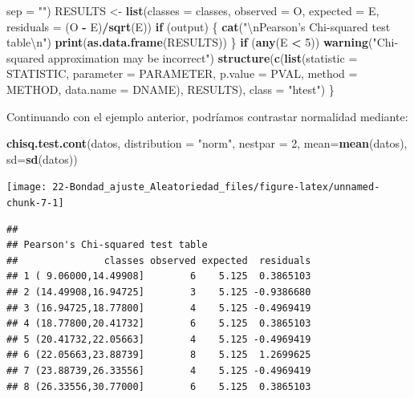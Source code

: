 \documentclass[
]{book}
\newenvironment{Shaded}{\begin{snugshade}}{\end{snugshade}}
\newcommand{\CharTok}[1]{\textcolor[rgb]{0.31,0.60,0.02}{#1}}
\newcommand{\ControlFlowTok}[1]{\textcolor[rgb]{0.13,0.29,0.53}{\textbf{#1}}}
\newcommand{\DataTypeTok}[1]{\textcolor[rgb]{0.13,0.29,0.53}{#1}}
\newcommand{\DecValTok}[1]{\textcolor[rgb]{0.00,0.00,0.81}{#1}}
\newcommand{\KeywordTok}[1]{\textcolor[rgb]{0.13,0.29,0.53}{\textbf{#1}}}
\newcommand{\NormalTok}[1]{#1}
\newcommand{\OperatorTok}[1]{\textcolor[rgb]{0.81,0.36,0.00}{\textbf{#1}}}
\newcommand{\StringTok}[1]{\textcolor[rgb]{0.31,0.60,0.02}{#1}}
\theoremstyle{break}
\theoremstyle{definition}
\theoremstyle{definition}
\theoremstyle{definition}
\theoremstyle{remark}
\begin{document}
\begin{Shaded}
\begin{Highlighting}[]
        \DataTypeTok{sep =} \StringTok{""}\NormalTok{)}
\NormalTok{    RESULTS <-}\StringTok{ }\KeywordTok{list}\NormalTok{(}\DataTypeTok{classes =}\NormalTok{ classes, }\DataTypeTok{observed =}\NormalTok{ O, }\DataTypeTok{expected =}\NormalTok{ E, }\DataTypeTok{residuals =}\NormalTok{ (O }\OperatorTok{-}\StringTok{ }
\StringTok{        }\NormalTok{E)}\OperatorTok{/}\KeywordTok{sqrt}\NormalTok{(E))}
    \ControlFlowTok{if}\NormalTok{ (output) \{}
        \KeywordTok{cat}\NormalTok{(}\StringTok{"}\CharTok{\textbackslash{}n}\StringTok{Pearson's Chi-squared test table}\CharTok{\textbackslash{}n}\StringTok{"}\NormalTok{)}
        \KeywordTok{print}\NormalTok{(}\KeywordTok{as.data.frame}\NormalTok{(RESULTS))}
\NormalTok{    \}}
    \ControlFlowTok{if}\NormalTok{ (}\KeywordTok{any}\NormalTok{(E }\OperatorTok{<}\StringTok{ }\DecValTok{5}\NormalTok{)) }
        \KeywordTok{warning}\NormalTok{(}\StringTok{"Chi-squared approximation may be incorrect"}\NormalTok{)}
    \KeywordTok{structure}\NormalTok{(}\KeywordTok{c}\NormalTok{(}\KeywordTok{list}\NormalTok{(}\DataTypeTok{statistic =}\NormalTok{ STATISTIC, }\DataTypeTok{parameter =}\NormalTok{ PARAMETER, }\DataTypeTok{p.value =}\NormalTok{ PVAL, }
        \DataTypeTok{method =}\NormalTok{ METHOD, }\DataTypeTok{data.name =}\NormalTok{ DNAME), RESULTS), }\DataTypeTok{class =} \StringTok{"htest"}\NormalTok{)}
\NormalTok{\}}
\end{Highlighting}
\end{Shaded}

Continuando con el ejemplo anterior, podríamos contrastar normalidad mediante:

\begin{Shaded}
\begin{Highlighting}[]
\KeywordTok{chisq.test.cont}\NormalTok{(datos, }\DataTypeTok{distribution =} \StringTok{"norm"}\NormalTok{, }\DataTypeTok{nestpar =} \DecValTok{2}\NormalTok{, }\DataTypeTok{mean=}\KeywordTok{mean}\NormalTok{(datos), }\DataTypeTok{sd=}\KeywordTok{sd}\NormalTok{(datos))}
\end{Highlighting}
\end{Shaded}

\begin{center}\texttt{[image: 22-Bondad\_ajuste\_Aleatoriedad\_files/figure-latex/unnamed-chunk-7-1]} \end{center}

\begin{verbatim}
## 
## Pearson's Chi-squared test table
##               classes observed expected  residuals
## 1 ( 9.06000,14.49908]        6    5.125  0.3865103
## 2 (14.49908,16.94725]        3    5.125 -0.9386680
## 3 (16.94725,18.77800]        4    5.125 -0.4969419
## 4 (18.77800,20.41732]        6    5.125  0.3865103
## 5 (20.41732,22.05663]        4    5.125 -0.4969419
## 6 (22.05663,23.88739]        8    5.125  1.2699625
## 7 (23.88739,26.33556]        4    5.125 -0.4969419
## 8 (26.33556,30.77000]        6    5.125  0.3865103
\end{verbatim}
\end{document}
